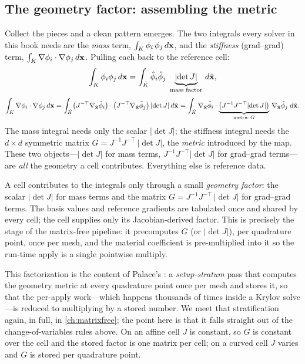 \subsection{The geometry factor: assembling the metric}

Collect the pieces and a clean pattern emerges. The two integrals every solver in
this book needs are the \emph{mass} term, $\int_K \phi_i\,\phi_j\,d\mathbf{x}$, and the
\emph{stiffness} (grad--grad) term, $\int_K \nabla\phi_i\cdot\nabla\phi_j\,d\mathbf{x}$.
Pulling each back to the reference cell:
\[
  \int_K \phi_i\phi_j\,d\mathbf{x}
  = \int_{\hat K} \hat\phi_i\hat\phi_j\;\underbrace{\lvert\det J\rvert}_{\text{mass factor}}\,d\hat{\mathbf{x}},
\]
\[
  \int_K \nabla\phi_i\cdot\nabla\phi_j\,d\mathbf{x}
  = \int_{\hat K} \bigl(J^{-\top}\nabla_{\hat{\mathbf{x}}}\hat\phi_i\bigr)\cdot
                  \bigl(J^{-\top}\nabla_{\hat{\mathbf{x}}}\hat\phi_j\bigr)\,\lvert\det J\rvert\,d\hat{\mathbf{x}}
  = \int_{\hat K} \nabla_{\hat{\mathbf{x}}}\hat\phi_i\cdot
      \underbrace{\bigl(J^{-1}J^{-\top}\lvert\det J\rvert\bigr)}_{\text{metric }G}\,
      \nabla_{\hat{\mathbf{x}}}\hat\phi_j\;d\hat{\mathbf{x}} .
\]
The mass integral needs only the scalar $|\det J|$; the stiffness integral needs the
$d\times d$ symmetric matrix $G = J^{-1}J^{-\top}\,|\det J|$, the \emph{metric}
introduced by the map. These two objects---$|\det J|$ for mass terms,
$J^{-1}J^{-\top}|\det J|$ for grad--grad terms---are \emph{all} the geometry a cell
contributes. Everything else is reference data.

\begin{keyidea}
A cell contributes to the integrals only through a small \emph{geometry factor}: the
scalar $|\det J|$ for mass terms and the matrix $G = J^{-1}J^{-\top}\,|\det J|$ for
grad--grad terms. The basis values and reference gradients are tabulated once and
shared by every cell; the cell supplies only its Jacobian-derived factor. This is
precisely the  stage of the matrix-free pipeline: it
precomputes $G$ (or $|\det J|$), per quadrature point, once per mesh, and the
material coefficient is pre-multiplied into it so the run-time apply is a single
pointwise multiply.
\end{keyidea}

This factorization is the content of Palace's : a
\emph{setup-stratum} pass that computes the geometry metric at every quadrature point
once per mesh and stores it, so that the per-apply work---which happens thousands of
times inside a Krylov solve---is reduced to multiplying by a stored number. We meet
that stratification again, in full, in \cref{ch:matrixfree}; the point here is that it
falls straight out of the change-of-variables rules above. On an affine cell $J$ is
constant, so $G$ is constant over the cell and the stored factor is one matrix per
cell; on a curved cell $J$ varies and $G$ is stored per quadrature point.

